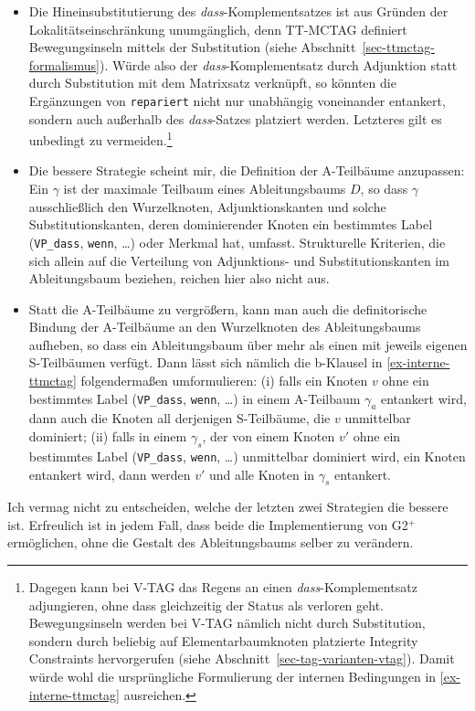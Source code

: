 \begin{itemize}
  \item Die Hineinsubstitutierung des {\it dass}-Komplementsatzes ist aus Gründen der Lokalitätseinschränkung unumgänglich, denn TT-MCTAG definiert Bewegungsinseln mittels der Substitution (siehe Abschnitt~\ref{sec-ttmctag-formalismus}). Würde also der {\it dass}-Komplementsatz durch Adjunktion statt durch Substitution mit dem Matrixsatz verknüpft, so könnten die Ergänzungen von {\tt repariert} nicht nur unabhängig voneinander entankert, sondern auch au\ss erhalb des {\it dass}-Satzes platziert werden. Letzteres gilt es unbedingt zu vermeiden.\footnote{Dagegen kann bei V-TAG das Regens an einen {\it dass}-Komplementsatz adjungieren, ohne dass gleichzeitig der Status als  verloren geht. Bewegungsinseln werden bei V-TAG nämlich nicht durch Substitution, sondern durch beliebig auf Elementarbaumknoten platzierte Integrity Constraints hervorgerufen (siehe Abschnitt~\ref{sec-tag-varianten-vtag}). Damit würde wohl die ursprüngliche Formulierung der internen Bedingungen in \ref{ex-interne-ttmctag} ausreichen.}
  \item Die bessere Strategie scheint mir, die Definition der A-Teilbäume anzupassen: Ein  $\gamma$ ist der maximale Teilbaum eines Ableitungsbaums $D$, so dass $\gamma$ ausschlie\ss lich den Wurzelknoten, Adjunktionskanten und solche Substitutionskanten, deren dominierender Knoten ein bestimmtes Label ({\tt VP\_dass}, {\tt wenn}, \ldots) oder Merkmal hat, umfasst. Strukturelle Kriterien, die sich allein auf die Verteilung von Adjunktions- und Substitutionskanten im Ableitungsbaum beziehen, reichen hier also nicht aus.%
  \item Statt die A-Teilbäume zu vergrö\ss ern, kann man auch die definitorische Bindung der A-Teilbäume an den Wurzelknoten des Ableitungsbaums aufheben, so dass ein Ableitungsbaum über mehr als einen  mit jeweils eigenen S-Teilbäumen verfügt. Dann lässt sich nämlich die b-Klausel in \ref{ex-interne-ttmctag} folgenderma\ss en umformulieren: (i) falls ein Knoten $v$ ohne ein bestimmtes Label ({\tt VP\_dass}, {\tt wenn}, \ldots) in einem A-Teilbaum $\gamma_a$ entankert wird, dann auch die Knoten all derjenigen S-Teilbäume, die $v$ unmittelbar dominiert; (ii) falls in einem  $\gamma_s$, der von einem Knoten $v'$ ohne ein bestimmtes Label ({\tt VP\_dass}, {\tt wenn}, \ldots) unmittelbar dominiert wird, ein Knoten entankert wird, dann werden $v'$ und alle Knoten in $\gamma_s$ entankert.  
\end{itemize} 
Ich vermag nicht zu entscheiden, welche der letzten zwei Strategien die bessere ist. Erfreulich ist in jedem Fall, dass beide die Implementierung von G2$^+$ ermöglichen, ohne die Gestalt des Ableitungsbaums selber zu verändern. 

